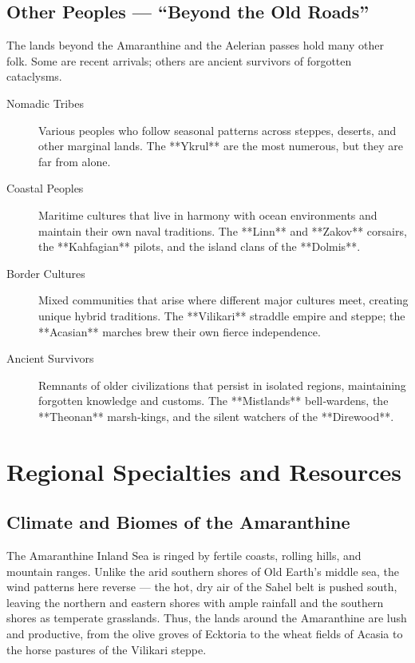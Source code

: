 \subsection*{Other Peoples — “Beyond the Old Roads”}
\label{subsec:other-peoples}

The lands beyond the Amaranthine and the Aelerian passes hold many other folk. Some are recent arrivals; others are ancient survivors of forgotten cataclysms.

\begin{description}
\item[Nomadic Tribes] Various peoples who follow seasonal patterns across steppes, deserts, and other marginal lands. The **Ykrul** are the most numerous, but they are far from alone.
\item[Coastal Peoples] Maritime cultures that live in harmony with ocean environments and maintain their own naval traditions. The **Linn** and **Zakov** corsairs, the **Kahfagian** pilots, and the island clans of the **Dolmis**.
\item[Border Cultures] Mixed communities that arise where different major cultures meet, creating unique hybrid traditions. The **Vilikari** straddle empire and steppe; the **Acasian** marches brew their own fierce independence.
\item[Ancient Survivors] Remnants of older civilizations that persist in isolated regions, maintaining forgotten knowledge and customs. The **Mistlands** bell‑wardens, the **Theonan** marsh‑kings, and the silent watchers of the **Direwood**.
\end{description}

\section{Regional Specialties and Resources}
\label{sec:regional-resources}

\subsection*{Climate and Biomes of the Amaranthine}

The Amaranthine Inland Sea is ringed by fertile coasts, rolling hills, and mountain ranges. Unlike the arid southern shores of Old Earth’s middle sea, the wind patterns here reverse — the hot, dry air of the Sahel belt is pushed south, leaving the northern and eastern shores with ample rainfall and the southern shores as temperate grasslands. Thus, the lands around the Amaranthine are lush and productive, from the olive groves of Ecktoria to the wheat fields of Acasia to the horse pastures of the Vilikari steppe.

